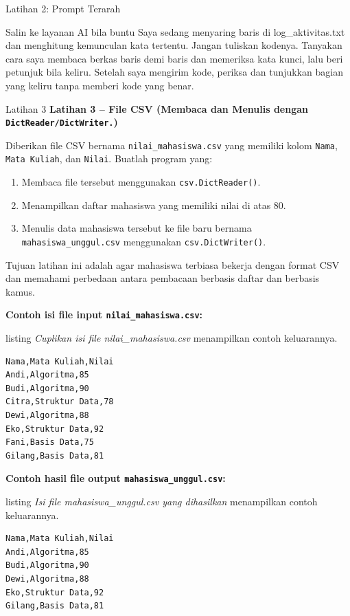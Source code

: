 \documentclass[aspectratio=169, table]{beamer}
\begin{document}
\begin{frame}{Latihan 2: Prompt Terarah}
\begin{block}{Salin ke layanan AI bila buntu}
\small Saya sedang menyaring baris di log\_aktivitas.txt dan menghitung kemunculan kata tertentu. Jangan tuliskan kodenya. Tanyakan cara saya membaca berkas baris demi baris dan memeriksa kata kunci, lalu beri petunjuk bila keliru. Setelah saya mengirim kode, periksa dan tunjukkan bagian yang keliru tanpa memberi kode yang benar.
\end{block}
\end{frame}

\begin{frame}[fragile,allowframebreaks=0.8]{Latihan 3}
\footnotesize
\textbf{Latihan 3 – File CSV (Membaca dan Menulis dengan \texttt{DictReader/DictWriter.})}\par\medskip
Diberikan file CSV bernama \texttt{nilai\_mahasiswa.csv} yang memiliki kolom \texttt{Nama}, \texttt{Mata Kuliah}, dan \texttt{Nilai}.  
Buatlah program yang:
\begin{enumerate}
    \item Membaca file tersebut menggunakan \texttt{csv.DictReader()}.  
    \item Menampilkan daftar mahasiswa yang memiliki nilai di atas 80.  
    \item Menulis data mahasiswa tersebut ke file baru bernama \texttt{mahasiswa\_unggul.csv} menggunakan \texttt{csv.DictWriter()}.  
\end{enumerate}

Tujuan latihan ini adalah agar mahasiswa terbiasa bekerja dengan format CSV dan memahami perbedaan antara pembacaan berbasis daftar dan berbasis kamus.

\noindent\textbf{Contoh isi file input \texttt{nilai\_mahasiswa.csv}:}

listing \textit{Cuplikan isi file nilai_mahasiswa.csv} menampilkan contoh keluarannya.

\begin{lstlisting}[language=bash, breaklines=true, basicstyle=\ttfamily\scriptsize]
Nama,Mata Kuliah,Nilai
Andi,Algoritma,85
Budi,Algoritma,90
Citra,Struktur Data,78
Dewi,Algoritma,88
Eko,Struktur Data,92
Fani,Basis Data,75
Gilang,Basis Data,81
\end{lstlisting}

\noindent\textbf{Contoh hasil file output \texttt{mahasiswa\_unggul.csv}:}

listing \textit{Isi file mahasiswa_unggul.csv yang dihasilkan} menampilkan contoh keluarannya.

\begin{lstlisting}[language=bash, breaklines=true, basicstyle=\ttfamily\scriptsize]
Nama,Mata Kuliah,Nilai
Andi,Algoritma,85
Budi,Algoritma,90
Dewi,Algoritma,88
Eko,Struktur Data,92
Gilang,Basis Data,81
\end{lstlisting}
\end{frame}
\end{document}
